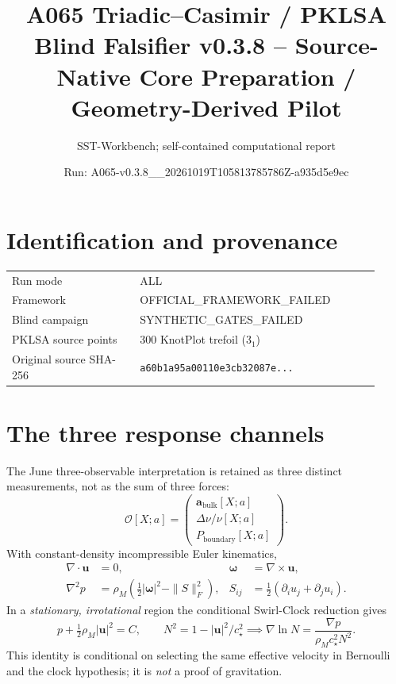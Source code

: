 \documentclass[10pt,a4paper]{article}
\title{A065 Triadic--Casimir / PKLSA\\ Blind Falsifier v0.3.8 -- Source-Native Core Preparation / Geometry-Derived Pilot}
\author{SST-Workbench; self-contained computational report}
\date{Run: A065-v0.3.8\_\_20261019T105813785786Z-a935d5e9ec}
\begin{document}
\maketitle
\begin{center}
\end{center}
\section{Identification and provenance}
\begin{tabular}{@{}p{0.32\linewidth}p{0.60\linewidth}@{}}
\toprule
Run mode & ALL \\
Framework & OFFICIAL\_FRAMEWORK\_FAILED \\
Blind campaign & SYNTHETIC\_GATES\_FAILED \\
PKLSA source points & 300 KnotPlot trefoil ($3_1$) \\
Original source SHA-256 & \texttt{a60b1a95a00110e3cb32087e...} \\
\bottomrule
\end{tabular}
\section{The three response channels}
The June three-observable interpretation is retained as three distinct measurements, not as the sum of three forces:
\[
\mathcal O[X;a]=\begin{pmatrix}
\mathbf a_{\mathrm{bulk}}[X;a]\\
\Delta\nu/\nu[X;a]\\
P_{\mathrm{boundary}}[X;a]
\end{pmatrix}.
\]
With constant-density incompressible Euler kinematics,
\begin{align}
\nabla\cdot\mathbf u&=0,&
\boldsymbol\omega&=\nabla\times\mathbf u,\\
\nabla^2p&=\rho_M\left(\tfrac12|\boldsymbol\omega|^2-\|S\|_F^2\right),&
S_{ij}&=\tfrac12(\partial_i u_j+\partial_j u_i).
\end{align}
In a \emph{stationary, irrotational} region the conditional Swirl-Clock reduction gives
\[
p+\tfrac12\rho_M|\mathbf u|^2=C,\qquad
N^2=1-|\mathbf u|^2/c_\star^2
\implies\nabla\ln N=\frac{\nabla p}{\rho_Mc_\star^2N^2}.
\]
This identity is conditional on selecting the same effective velocity in Bernoulli and the clock hypothesis; it is \emph{not} a proof of gravitation.
\end{document}
